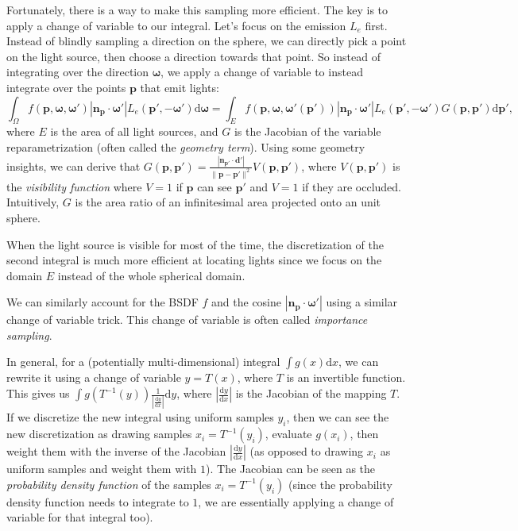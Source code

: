 Fortunately, there is a way to make this sampling more efficient. The key is to apply a change of variable to our integral. Let's focus on the emission $L_e$ first. Instead of blindly sampling a direction on the sphere, we can directly pick a point on the light source, then choose a direction towards that point. So instead of integrating over the direction $\mathbf{\omega}$, we apply a change of variable to instead integrate over the points $\mathbf{p}$ that emit lights:
\begin{equation}
    \int_{\Omega} f(\mathbf{p}, \mathbf{\omega}, \mathbf{\omega}') |\mathbf{n}_{\mathbf{p}} \cdot \mathbf{\omega}'| L_e(\mathbf{p}', -\mathbf{\omega}') \mathrm{d} \mathbf{\omega} =
    \int_{E} f(\mathbf{p}, \mathbf{\omega}, \mathbf{\omega}'(\mathbf{p}')) |\mathbf{n}_{\mathbf{p}} \cdot \mathbf{\omega}'| L_e(\mathbf{p}', -\mathbf{\omega}') G(\mathbf{p}, \mathbf{p}') \mathrm{d} \mathbf{p}',
\end{equation}
where $E$ is the area of all light sources, and $G$ is the Jacobian of the variable reparametrization (often called the \emph{geometry term}). Using some geometry insights, we can derive that $G(\mathbf{p}, \mathbf{p}') = \frac{|\mathbf{n}_{\mathbf{p}'} \cdot \mathbf{d}'|}{\|\mathbf{p} - \mathbf{p}'\|^2} V(\mathbf{p}, \mathbf{p}')$, where $V(\mathbf{p}, \mathbf{p}')$ is the \emph{visibility function} where $V=1$ if $\mathbf{p}$ can see $\mathbf{p}'$ and $V=1$ if they are occluded. Intuitively, $G$ is the area ratio of an infinitesimal area projected onto an unit sphere.

When the light source is visible for most of the time, the discretization of the second integral is much more efficient at locating lights since we focus on the domain $E$ instead of the whole spherical domain.

We can similarly account for the BSDF $f$ and the cosine $|\mathbf{n}_{\mathbf{p}} \cdot \mathbf{\omega}'|$ using a similar change of variable trick. This change of variable is often called \emph{importance sampling}.

In general, for a (potentially multi-dimensional) integral $\int g(x) \mathrm{d}x$, we can rewrite it using a change of variable $y = T(x)$, where $T$ is an invertible function. This gives us $\int g(T^{-1}(y)) \frac{1}{|\frac{\mathrm{d}y}{\mathrm{d}x}|} \mathrm{d}y$, where $|\frac{\mathrm{d}y}{\mathrm{d}x}|$ is the Jacobian of the mapping $T$. If we discretize the new integral using uniform samples $y_i$, then we can see the new discretization as drawing samples $x_i = T^{-1}(y_i)$, evaluate $g(x_i)$, then weight them with the inverse of the Jacobian $|\frac{\mathrm{d}y}{\mathrm{d}x}|$ (as opposed to drawing $x_i$ as uniform samples and weight them with $1$). The Jacobian can be seen as the \emph{probability density function} of the samples $x_i = T^{-1}(y_i)$ (since the probability density function needs to integrate to $1$, we are essentially applying a change of variable for that integral too). 

